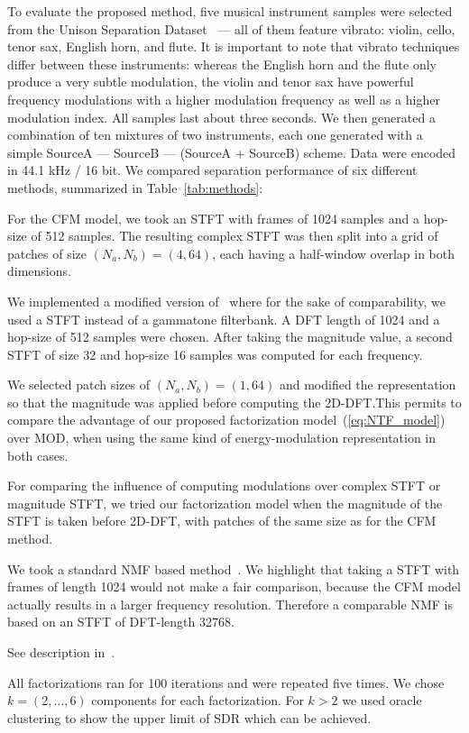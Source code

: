 To evaluate the proposed method, five musical instrument samples were selected from the Unison Separation Dataset~\cite{oss_unison} --- all of them feature vibrato: violin, cello, tenor sax, English horn, and flute. It is important to note that vibrato techniques differ between these instruments: whereas the English horn and the flute only produce a very subtle modulation, the violin and tenor sax have powerful frequency modulations with a higher modulation frequency as well as a higher modulation index. 
All samples last about three seconds. 
We then generated a combination of ten mixtures of two instruments, each one generated with a simple SourceA --- SourceB --- (SourceA + SourceB) scheme. Data were encoded in 44.1 kHz / 16 bit.
We compared separation performance of six different methods, summarized in Table~\ref{tab:methods}:
\begin{description}[style=unboxed,leftmargin=0cm]
\item[CFM] For the CFM model, we took an STFT with frames of 1024 samples and a hop-size of 512 samples. The resulting complex STFT was then split into a grid of patches of size $(N_a, N_b) = (4, 64)$, each having a half-window overlap in both dimensions.
\item[MOD] We implemented a modified version of~\cite{barker13} where for the sake of comparability, we used a STFT instead of a gammatone filterbank. A DFT length of 1024 and a hop-size of 512 samples were chosen. After taking the magnitude value, a second STFT of size 32 and hop-size 16 samples was computed for each frequency.
\item[CFMMOD] We selected patch sizes of $(N_a, N_b) = (1, 64)$ and modified the representation so that the magnitude was applied before computing the 2D-DFT.\@ This permits to compare the advantage of our proposed factorization model~(\ref{eq:NTF_model}) over MOD, when using the same kind of energy-modulation representation in both cases.
\item[CFMM] For comparing the influence of computing modulations over complex STFT or magnitude STFT, we tried our factorization model when the magnitude of the STFT is taken before 2D-DFT, with patches of the same size as for the CFM method.
\item[NMF] We took a standard NMF based method~\cite{virtanen07}. We highlight that taking a STFT with frames of length 1024 would not make a fair comparison, because the CFM model actually results in a larger frequency resolution. Therefore a comparable NMF is based on an STFT of DFT-length 32768.
\item[HR-NMF] See description in~\cite{magron15a}.
\end{description}
All factorizations ran for 100 iterations and were repeated five times. We chose $k=(2,\ldots,6)$ components for each factorization. For $k > 2$ we used oracle clustering to show the upper limit of SDR which can be achieved.

